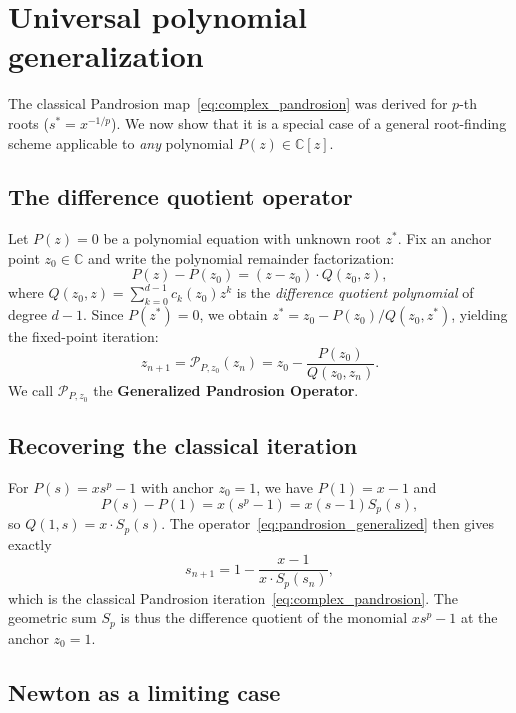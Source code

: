 \documentclass[11pt,a4paper]{article}
\theoremstyle{definition}
\newcommand{\CC}{\mathbb{C}}
\begin{document}
\section{Universal polynomial generalization}
\label{sec:universal_poly}

The classical Pandrosion map~\eqref{eq:complex_pandrosion} was derived for $p$-th roots ($s^* = x^{-1/p}$). We now show that it is a special case of a general root-finding scheme applicable to \emph{any} polynomial $P(z) \in \CC[z]$.

\subsection{The difference quotient operator}

Let $P(z) = 0$ be a polynomial equation with unknown root $z^*$. Fix an anchor point $z_0 \in \CC$ and write the polynomial remainder factorization:
\begin{equation}
  P(z) - P(z_0) = (z - z_0) \cdot Q(z_0, z),
\end{equation}
where $Q(z_0, z) = \sum_{k=0}^{d-1} c_k(z_0) z^k$ is the \emph{difference quotient polynomial} of degree $d-1$.  Since $P(z^*) = 0$, we obtain $z^* = z_0 - P(z_0)/Q(z_0, z^*)$, yielding the fixed-point iteration:
\begin{equation}
  \label{eq:pandrosion_generalized}
  \boxed{z_{n+1} = \mathcal{P}_{P, z_0}(z_n) = z_0 - \frac{P(z_0)}{Q(z_0, z_n)}.}
\end{equation}
We call $\mathcal{P}_{P, z_0}$ the \textbf{Generalized Pandrosion Operator}.

\subsection{Recovering the classical iteration}

For $P(s) = x s^p - 1$ with anchor $z_0 = 1$, we have $P(1) = x - 1$ and
\[
  P(s) - P(1) = x(s^p - 1) = x(s-1) S_p(s),
\]
so $Q(1, s) = x \cdot S_p(s)$.  The operator~\eqref{eq:pandrosion_generalized} then gives exactly
\[
  s_{n+1} = 1 - \frac{x-1}{x \cdot S_p(s_n)},
\]
which is the classical Pandrosion iteration~\eqref{eq:complex_pandrosion}.  The geometric sum $S_p$ is thus the difference quotient of the monomial $x s^p - 1$ at the anchor $z_0 = 1$.

\subsection{Newton as a limiting case}
\end{document}
